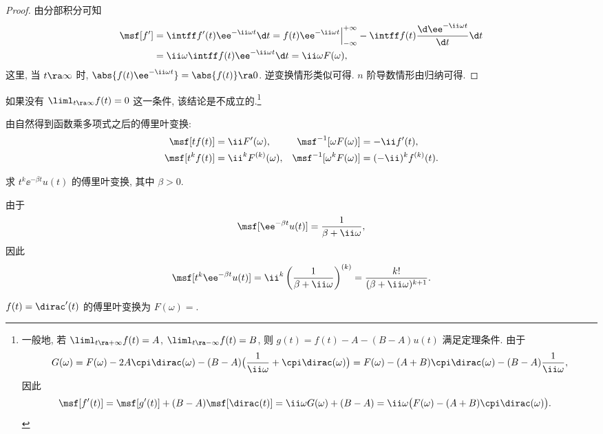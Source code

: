\begin{proof}
  由分部积分可知
  \begin{align*}
    \msf[f']
    &=\intff f'(t)\ee^{-\ii \omega t}\d t
    =f(t)\ee^{-\ii \omega t}\Big|_{-\infty}^{+\infty}-\intff f(t)\frac{\d \ee^{-\ii \omega t}}{\d t}\d t\\
    &=\ii \omega \intff f(t)\ee^{-\ii \omega t}\d t
    =\ii \omega F(\omega),
  \end{align*}
  这里, 当 $t\ra \infty$ 时, $\abs{f(t)\ee^{-\ii\omega t}}=\abs{f(t)}\ra 0$.
  逆变换情形类似可得.
  $n$ 阶导数情形由归纳可得.
\end{proof}

如果没有 $\liml_{t\ra\infty}f(t)=0$ 这一条件, 该结论是不成立的.\footnote{
  一般地, 若 $\liml_{t\ra+\infty}f(t)=A$, $\liml_{t\ra-\infty}f(t)=B$, 则 $g(t)=f(t)-A-(B-A)u(t)$ 满足定理条件.
  由于
  \[
    G(\omega)
    =F(\omega)-2A\cpi\dirac(\omega)-(B-A)\bigl(\frac1{\ii \omega}+\cpi\dirac(\omega)\bigr)
    =F(\omega)-(A+B)\cpi\dirac(\omega)-(B-A)\frac1{\ii \omega},
  \]
  因此
  \begin{align*}
    \msf[f'(t)]
    &=\msf[g'(t)]+(B-A)\msf[\dirac(t)]
    =\ii \omega G(\omega)+(B-A)
    =\ii \omega \bigl(F(\omega)-(A+B)\cpi\dirac(\omega)\bigr).
  \end{align*}
}

由\thmFDif 自然得到函数乘多项式之后的傅里叶变换:
\begin{align*}
  \msf[tf(t)]&=\ii F'(\omega),&
  \msf^{-1}[\omega F(\omega)]&=-\ii f'(t),\\
  \msf[t^kf(t)]&=\ii^kF^{(k)}(\omega),&
  \msf^{-1}[\omega^kF(\omega)]&=(-\ii )^kf^{(k)}(t).
\end{align*}

\begin{example}\label{exam:fourier-transform-power-rational}
  求 $t^k \ee^{-\beta t}u(t)$ 的傅里叶变换, 其中 $\beta>0$.
\end{example}

\begin{solution}
  由于
  \[
    \msf[\ee^{-\beta t}u(t)]=\frac{1}{\beta+\ii \omega},
  \]
  因此
  \[
    \msf[t^k\ee^{-\beta t}u(t)]=\ii^k\left(\frac1{\beta+\ii \omega}\right)^{(k)}
    =\frac{k!}{(\beta+\ii \omega)^{k+1}}.
  \]
\end{solution}

\begin{exercise}
  $f(t)=\dirac'(t)$ 的傅里叶变换为 $F(\omega)=$\fillblank{}.
\end{exercise}

